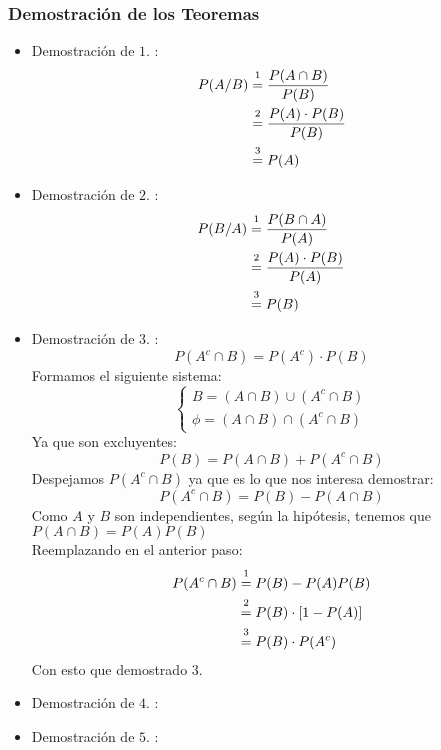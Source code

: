 \subsubsection{Demostración de los Teoremas}
\begin{itemize}
\item Demostración de $1.$ :
\begin{align*}
P(A/B) &\varstackrel{1}{=} \dfrac{P(A\cap B)}{P(B)} \\
&\varstackrel{2}{=} \dfrac{P(A)\cdot P(B)}{P(B)} \\
&\varstackrel{3}{=} P(A)
\end{align*}
\item Demostración de $2.$ :
\begin{align*}
P(B/A) &\varstackrel{1}{=} \dfrac{P(B\cap A)}{P(A)} \\
&\varstackrel{2}{=} \dfrac{P(A)\cdot P(B)}{P(A)}  \\
&\varstackrel{3}{=} P(B)
\end{align*}
\item Demostración de $3.$ :
$$P(A^c \cap B) = P(A^c)\cdot P(B)$$
Formamos el siguiente sistema:
$$
\begin{cases} 
B = (A\cap B) \cup (A^c \cap B)\\
\phi = (A\cap B) \cap (A^c \cap B)
\end{cases}
$$
Ya que son excluyentes:
$$P(B)=P(A\cap B)+P(A^c \cap B)$$
Despejamos $P(A^c \cap B)$ ya que es lo que nos interesa demostrar:
$$P(A^c \cap B)=P(B)-P(A\cap B)$$
Como $A$ y $B$ son independientes, según la hipótesis, tenemos que $P(A\cap B)=P(A)P(B)$\\
Reemplazando en el anterior paso:
\begin{align*}
P(A^c \cap B) &\varstackrel{1}{=} P(B)-P(A)P(B) \\
&\varstackrel{2}{=} P(B)\cdot [1-P(A)]  \\
&\varstackrel{3}{=} P(B)\cdot P(A^c)
\end{align*}
Con esto que demostrado $3$.
\item Demostración de $4.$ :
\item Demostración de $5.$ :
\end{itemize}
